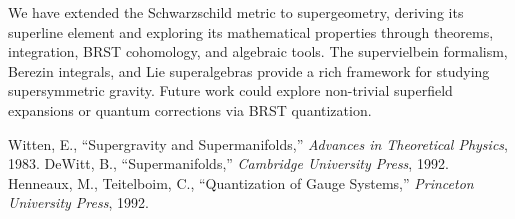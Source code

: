 \documentclass[12pt]{article}
\theoremstyle{plain}
\begin{document}
We have extended the Schwarzschild metric to supergeometry, deriving its superline element and exploring its mathematical properties through theorems, integration, BRST cohomology, and algebraic tools. The supervielbein formalism, Berezin integrals, and Lie superalgebras provide a rich framework for studying supersymmetric gravity. Future work could explore non-trivial superfield expansions or quantum corrections via BRST quantization.

\begin{thebibliography}{9}
  Witten, E., ``Supergravity and Supermanifolds,'' \emph{Advances in Theoretical Physics}, 1983.
  DeWitt, B., ``Supermanifolds,'' \emph{Cambridge University Press}, 1992.
  Henneaux, M., Teitelboim, C., ``Quantization of Gauge Systems,'' \emph{Princeton University Press}, 1992.
\end{thebibliography}
\end{document}
